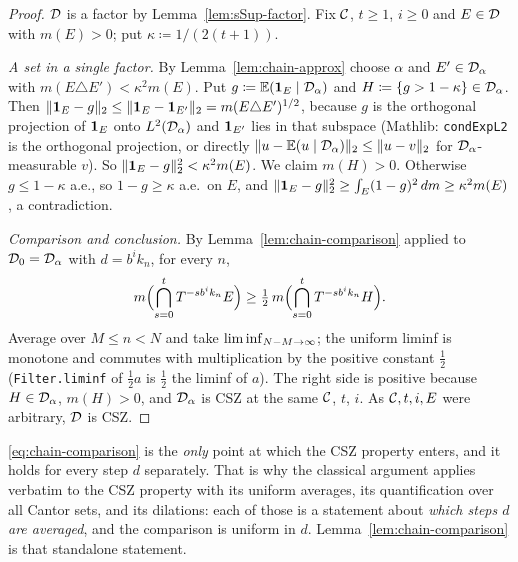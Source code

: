 \begin{proof}
  \leanok
  $\mathcal{D}$ is a factor by Lemma~\ref{lem:sSup-factor}.  Fix $\mathcal{C}$, $t \geq 1$, $i \geq 0$ and
  $E \in \mathcal{D}$ with $m(E) > 0$; put $\kappa \coloneqq 1/(2(t+1))$.

  \emph{A set in a single factor.}  By Lemma~\ref{lem:chain-approx} choose $\alpha$ and
  $E' \in \mathcal{D}_\alpha$ with $m(E \triangle E') < \kappa^2 m(E)$.  Put
  $g \coloneqq \mathbb{E}(\mathbf{1}_E\mid\mathcal{D}_\alpha)$ and $H \coloneqq \{g > 1-\kappa\} \in \mathcal{D}_\alpha$.
  Then $\lVert \mathbf{1}_E - g \rVert_2 \leq \lVert \mathbf{1}_E - \mathbf{1}_{E'} \rVert_2 = m(E\triangle E')^{1/2}$, because
  $g$ is the orthogonal projection of $\mathbf{1}_E$ onto $L^2(\mathcal{D}_\alpha)$ and $\mathbf{1}_{E'}$ lies in
  that subspace (Mathlib: \texttt{condExpL2} is the orthogonal projection, or directly
  $\lVert u - \mathbb{E}(u\mid\mathcal{D}_\alpha) \rVert_2 \leq \lVert u - v \rVert_2$ for $\mathcal{D}_\alpha$-measurable $v$).
  So $\lVert \mathbf{1}_E - g \rVert_2^2 < \kappa^2 m(E)$.  We claim $m(H) > 0$.  Otherwise $g \leq 1 - \kappa$
  a.e., so $1 - g \geq \kappa$ a.e.\ on $E$, and
  $\lVert \mathbf{1}_E - g \rVert_2^2 \geq \int_E (1-g)^2\,dm \geq \kappa^2 m(E)$, a contradiction.

  \emph{Comparison and conclusion.}  By Lemma~\ref{lem:chain-comparison} applied to
  $\mathcal{D}_0 = \mathcal{D}_\alpha$ with $d = b^ik_n$, for every $n$,
  \[
    m\Bigl(\bigcap_{s=0}^{t} T^{-sb^ik_n}E\Bigr) \geq \tfrac12\, m\Bigl(\bigcap_{s=0}^{t} T^{-sb^ik_n}H\Bigr) .
  \]
  Average over $M \leq n < N$ and take $\liminf_{N-M \to \infty}$; the uniform liminf is monotone and
  commutes with multiplication by the positive constant $\tfrac12$
  (\texttt{Filter.liminf} of $\tfrac12 a$ is $\tfrac12$ the liminf of $a$).  The right side is
  positive because $H \in \mathcal{D}_\alpha$, $m(H) > 0$, and $\mathcal{D}_\alpha$ is CSZ at the same
  $\mathcal{C}$, $t$, $i$.  As $\mathcal{C}, t, i, E$ were arbitrary, $\mathcal{D}$ is CSZ.
\end{proof}

\begin{remark}
  \eqref{eq:chain-comparison} is the \emph{only} point at which the CSZ property enters, and it
  holds for every step $d$ separately.  That is why the classical argument applies verbatim to
  the CSZ property with its uniform averages, its quantification over all Cantor sets, and its
  dilations: each of those is a statement about \emph{which steps $d$ are averaged}, and the
  comparison is uniform in $d$.  Lemma~\ref{lem:chain-comparison} is that standalone statement.
\end{remark}

